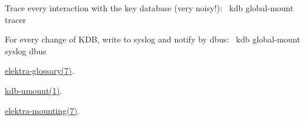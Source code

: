 Trace every interaction with the key database (very noisy!)\+:~\newline
 {\ttfamily kdb global-\/mount tracer}

For every change of K\+DB, write to syslog and notify by dbus\+:~\newline
 {\ttfamily kdb global-\/mount syslog dbus}


\begin{DoxyItemize}
\item \mbox{\hyperlink{doc_help_elektra-glossary_md}{elektra-\/glossary(7)}}.
\item \mbox{\hyperlink{doc_help_kdb-umount_md}{kdb-\/umount(1)}}.
\item \mbox{\hyperlink{doc_help_elektra-mounting_md}{elektra-\/mounting(7)}}. 
\end{DoxyItemize}